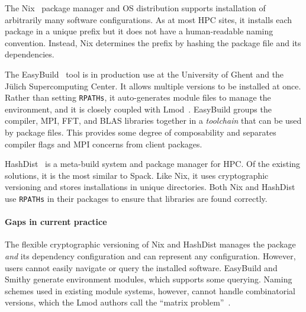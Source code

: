 The Nix~\cite{dolstra+:icfp08,dolstra+:lisa04} package manager and OS 
distribution supports installation of arbitrarily many software 
configurations.  As at most HPC sites, it installs each package
in a unique prefix but it does not have a human-readable naming 
convention.  Instead, Nix determines the prefix by hashing the package
file and its dependencies.

The EasyBuild~\cite{hoste+:pyhpc12} tool is in production use at
the University of Ghent and the J\"ulich Supercomputing Center.
It allows multiple versions to be installed at once.  Rather
than setting {\tt RPATHs}, it auto-generates module files
to manage the environment, and it is closely coupled with
Lmod~\cite{geimer+:hust14}.  EasyBuild groups the compiler, MPI, FFT, and
BLAS libraries together in a {\it toolchain} that can be used by
package files. This provides some degree of composability and
separates compiler flags and MPI concerns from client packages.

HashDist~\cite{hashdist} is a meta-build system and package manager
for HPC.  Of the existing solutions, it is the most similar to Spack.
Like Nix, it uses cryptographic versioning and stores installations in
unique directories.
%
Both Nix and HashDist use {\tt RPATHs} in their packages to ensure that
libraries are found correctly.

\paragraph{Gaps in current practice}
The flexible cryptographic versioning of Nix and HashDist manages 
the package {\it and} its dependency configuration and can represent any
configuration. However, users cannot easily navigate or query the installed
software.
%
EasyBuild and Smithy generate environment modules, which supports some 
querying. Naming schemes used in existing module systems, however, cannot 
handle combinatorial versions, which the Lmod authors call the 
``matrix problem''~\cite{mclay:lmod-tutorial}.


